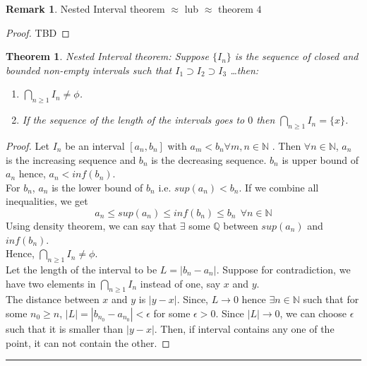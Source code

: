 \documentclass[12pt]{report}
\newtheorem{thm}{Theorem}
\theoremstyle{definition}
\newtheorem*{rem}{Remark}
\begin{document}
\begin{rem}
    Nested Interval theorem $\approx$ lub $\approx$ theorem $4$
\end{rem}
\begin{proof}
    TBD
\end{proof}
\begin{thm}
    Nested Interval theorem: Suppose $\{I_n\}$ is the sequence of closed and bounded non-empty intervals such that $I_1 \supset I_2 \supset I_3$ \dots then:
    \begin{enumerate}
        \item $\bigcap\limits_{n \geq 1} I_n \neq \phi$.
        \item If the sequence of the length of the intervals goes to $0$ then $\bigcap\limits_{n \geq 1} I_n = \{x\}$. 
    \end{enumerate}
\end{thm}

\begin{proof}
    Let $I_n$ be an interval $[a_n, b_n]$ with $a_m < b_n \forall m,n \in \mathbb{N}$ . Then $\forall n \in \mathbb{N}$, $a_n$ is the increasing sequence and $b_n$ is the decreasing sequence. $b_n$ is upper bound of $a_n$ hence, $a_n < inf(b_n)$.\\
    For $b_n$, $a_n$ is the lower bound of $b_n$ i.e. $sup(a_n)< b_n$. If we combine all inequalities, we get 
    $$ a_n \leq sup(a_n) \leq inf(b_n) \leq b_n ~~ \forall n \in \mathbb{N}$$
    Using density theorem, we can say that $\exists$ some $\mathbb{Q}$ between $sup(a_n)$ and $inf(b_n)$.\\
    Hence, $\bigcap\limits_{n \geq 1} I_n \neq \phi$.\\
    Let the length of the interval to be $L = |b_n - a_n|$. Suppose for contradiction, we have two elements in $\bigcap\limits_{n\geq 1}I_n$ instead of one, say $x$ and $y$. \\ The distance between $x$ and $y$ is $|y - x|$. Since, $L \to 0$ hence $\exists n \in \mathbb{N}$ such that for some $n_0 \geq n$, $|L| = |b_{n_0} - a_{n_0}|< \epsilon$ for some $\epsilon > 0$. Since $|L| \to 0$, we can choose $\epsilon$ such that it is smaller than $|y - x|$. Then, if interval contains any one of the point, it can not contain the other.
\end{proof}

\hrule
\end{document}
